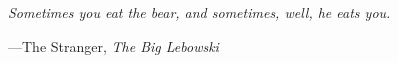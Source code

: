 \chapter*{}
\begin{center}
  \it Sometimes you eat the bear, and sometimes, well, he eats you.
  \begin{flushright}
    ---The Stranger, \textit{The Big Lebowski}
  \end{flushright}
\end{center}
